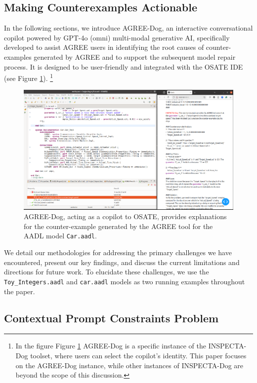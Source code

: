 \subsection{Making Counterexamples Actionable} 
In the following sections, we introduce AGREE-Dog, an interactive conversational copilot powered by GPT-4o (omni) multi-modal generative AI, specifically developed to assist AGREE users in identifying the root causes of counter-examples generated by AGREE and to support the subsequent model repair process. It is designed to be user-friendly and integrated with the OSATE IDE (see Figure \ref{fig:AGREEDOG}). \footnote{In the figure Figure \ref{fig:AGREEDOG} AGREE-Dog is a specific instance of the INSPECTA-Dog toolset, where users can select the copilot's identity. This paper focuses on the AGREE-Dog instance, while other instances of INSPECTA-Dog are beyond the scope of this discussion.}

\begin{figure}[htbp]  
    \centering
    \includegraphics[width=\textwidth]{AGREE-Dog.png}  %
    \caption{AGREE-Dog, acting as a copilot to OSATE, provides explanations for the counter-example generated by the AGREE tool for the AADL model \texttt{Car.aadl}.}
    \label{fig:AGREEDOG}
\end{figure}


 We detail our methodologies for addressing the primary challenges we have encountered, present our key findings, and discuss the current limitations and directions for future work. To elucidate these challenges, we use the \texttt{Toy\_Integers.aadl} and \texttt{car.aadl} models as two running examples throughout the paper.

\subsection{Contextual Prompt Constraints Problem}

